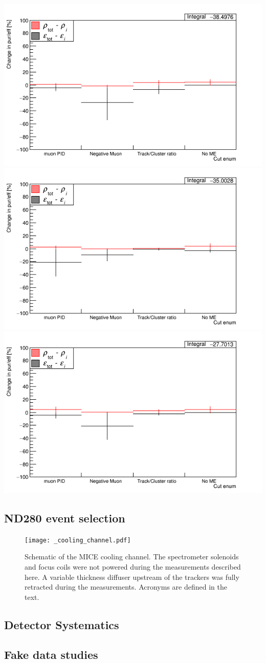 \documentclass[%
 reprint,
 amsmath,amssymb,
 aps,
]{revtex4-2}
\begin{document}
 \includegraphics[width=.45\textwidth]{images/nMinusOneCuts_sample2.png}
    \includegraphics[width=.45\textwidth]{images/nMinusOneCuts_sample1.png}
    \includegraphics[width=.45\textwidth]{images/nMinusOneCuts_sample0.png}

\subsection{ND280 event selection}
\begin{figure}[htbp]
\begin{center}
\texttt{[image: \_cooling\_channel.pdf]}
\end{center}
\caption{Schematic of the MICE cooling channel. The spectrometer solenoids and focus coils were not powered during the measurements described here. A variable thickness diffuser upstream of the trackers was fully retracted during the measurements. Acronyms are defined in the text.}
\label{fig:micecc}
\end{figure}

\subsection{Detector Systematics}
\label{sec:selection}

\subsection{Fake data studies}
\end{document}
